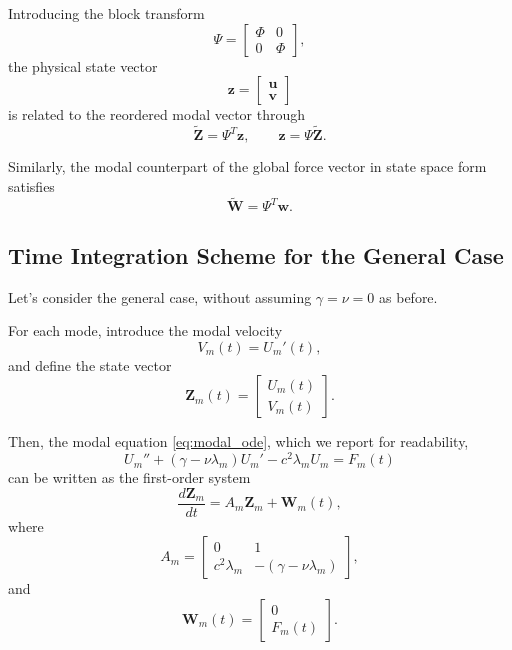 \documentclass{Configuration_Files/PoliMi3i_thesis}
\begin{document}
Introducing the block transform
\begin{equation*}
\Psi
=
\begin{bmatrix}
\Phi&0\\
0&\Phi
\end{bmatrix},
\end{equation*}
the physical state vector
\begin{equation*}
\mathbf z
=
\begin{bmatrix}
\mathbf u\\
\mathbf v
\end{bmatrix}
\end{equation*}
is related to the reordered modal vector through
\begin{equation*}
\widetilde{\mathbf Z}
=
\Psi^T\mathbf z,
\qquad
\mathbf z
=
\Psi\widetilde{\mathbf Z}.
\end{equation*}

Similarly, the modal counterpart of the global force vector in state space form satisfies
\begin{equation*}
\widetilde{\mathbf W}
=
\Psi^T\mathbf w.
\end{equation*}

\subsection{Time Integration Scheme for the General Case}
Let's consider the general case, without assuming $\gamma=\nu=0$ as before.

For each mode, introduce the modal velocity
\begin{equation*}
V_m(t)=U_m'(t),
\end{equation*}
and define the state vector
\begin{equation*} 
\mathbf Z_m(t)
=
\begin{bmatrix}
U_m(t)\\
V_m(t)
\end{bmatrix}.
\end{equation*}

Then, the modal equation \eqref{eq:modal_ode}, which we report for readability,
\begin{equation*}
U_m''
+
\left(
\gamma-\nu\lambda_m
\right)
U_m'
-
c^2\lambda_mU_m
=
F_m(t)
\end{equation*}
can be written as the first-order system
\begin{equation*} 
\frac{d\mathbf Z_m}{dt}
=
A_m\mathbf Z_m
+
\mathbf W_m(t),
\end{equation*}
where
\begin{equation*} 
    A_m
    =
    \begin{bmatrix}
    0 & 1\\
    c^2\lambda_m & -(\gamma-\nu\lambda_m)
    \end{bmatrix},
\end{equation*}
and
\begin{equation*}
    \mathbf W_m(t)
    =
    \begin{bmatrix}
    0\\
    F_m(t)
    \end{bmatrix}.
\end{equation*}
\end{document}
